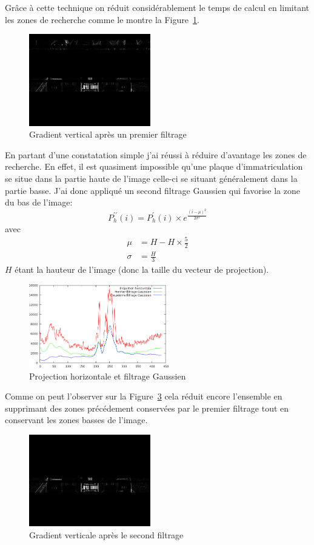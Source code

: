 \documentclass[a4paper,10pt,twocolumn]{article}
\begin{document}
Grâce à cette technique on réduit considérablement le temps de calcul en limitant les zones de recherche comme le montre la Figure~\ref{v_filter}.
\begin{figure}[H]
	\centering 
	  \includegraphics[width=200px]{img/991213-006_v_filter_1-2.png}
	\caption{Gradient vertical après un premier filtrage\label{v_filter}}
\end{figure}
En partant d'une constatation simple j'ai réussi à réduire d'avantage les zones de recherche. En effet, il est quasiment impossible qu'une plaque d'immatriculation se situe dans la partie haute de l'image celle-ci se situant généralement dans la partie basse. J'ai donc appliqué un second filtrage Gaussien qui favorise la zone du bas de l'image:
\begin{equation}
  P_h^{\prime\prime}(i) = P_h^{\prime}(i) \times e^{\frac{(i - \mu)^2}{2\sigma^2}}
\end{equation}
avec 
\begin{align*}
  \mu & = H - H\times \frac{5}{2}\\
  \sigma & = \frac{H}{3}
\end{align*}
$H$ étant la hauteur de l'image (donc la taille du vecteur de projection).

\begin{figure}[H]
	\centering 
	  \includegraphics[width=230px]{img/project_h_gauss.png}
	\caption{Projection horizontale et filtrage Gaussien\label{h_proj_gauss}}
\end{figure}

Comme on peut l'observer sur la Figure~\ref{v_filter_gauss} cela réduit encore l'ensemble en supprimant des zones précédement conservées par le premier filtrage tout en conservant les zones basses de l'image.
\begin{figure}[H]
	\centering 
	  \includegraphics[width=200px]{img/991213-006_v_filter_gauss.png}
	\caption{Gradient verticale après le second filtrage\label{v_filter_gauss}}
\end{figure}
\end{document}
